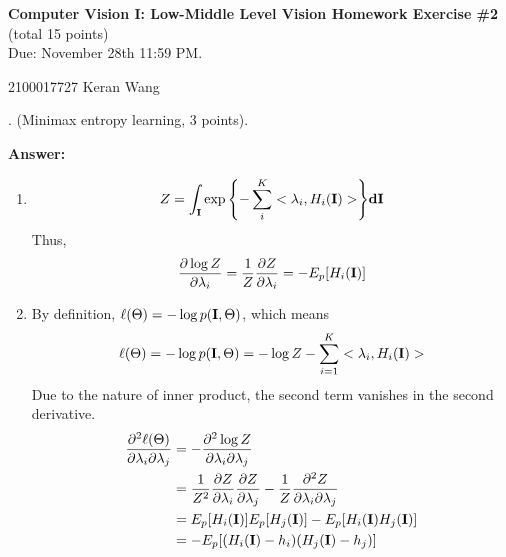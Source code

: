 \documentclass[11pt]{article}
\newcommand{\I}{{\bf I}}
\begin{document}
\begin{center}
{\bf Computer Vision I: Low-Middle Level Vision  Homework Exercise \#2 }  \\ (total 15 points)   \\
Due: November 28th 11:59 PM.

2100017727 Keran Wang
\end{center}

\vspace{5mm}

\vspace{5mm}

. (Minimax entropy learning, 3 points).

\textbf{Answer:}
\begin{enumerate}
    \item
    $$
    Z = \int_{\I}\exp{\left\{-\sum_{i}^{K}<\lambda_i, H_i(\I)>\right\}}\textbf{d}\I
    $$
    Thus,
    $$
    \frac{\partial \log{Z}}{\partial\lambda_i}=\frac{1}{Z}\frac{\partial Z}{\partial \lambda_i}=-E_p[H_i(\I)]
    $$

    \item
    By definition, $\ell(\Theta)=-\log p(\I, \Theta)$, which means
    $$
    \ell(\Theta)=-\log p(\I, \Theta)=-\log Z-\sum_{i=1}^{K}<\lambda_i, H_i(\I)>
    $$
    Due to the nature of inner product, the second term vanishes in the second derivative.
    $$
    \begin{aligned}
    \frac{\partial^2\ell(\Theta)}{\partial\lambda_i\partial\lambda_j} &= -\frac{\partial^2 \log Z}{\partial\lambda_i\partial\lambda_j} \\
                                                                      &= \frac{1}{Z^2}\frac{\partial Z}{\partial \lambda_i}\frac{\partial Z}{\partial \lambda_j} - \frac{1}{Z}\frac{\partial^2 Z}{\partial\lambda_i\partial\lambda_j} \\
                                                                      &= E_p[H_i(\I)]E_p[H_j(\I)]-E_p[H_i(\I)H_j(\I)] \\
                                                                      &= -E_p[(H_i(\I)-h_i)(H_j(\I)-h_j)]
    \end{aligned}
    $$


\end{enumerate}
\end{document}
